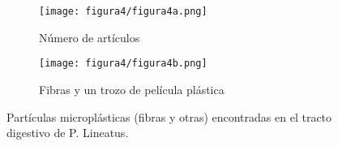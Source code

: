 \begin{figure}[h!t]
	\centering
	\begin{subfigure}[b]{0.6\linewidth}
		\texttt{[image: figura4/figura4a.png]}
		\caption{Número de artículos}
		\label{fig:numero_articulos}
	\end{subfigure}
	\begin{subfigure}[b]{0.2\linewidth}
		\texttt{[image: figura4/figura4b.png]}
		\caption{Fibras y un trozo de película plástica}
		\label{fig:fibra_pelicula}
	\end{subfigure}
	\caption{Partículas microplásticas (fibras y otras) encontradas en el tracto digestivo de P. Lineatus.}
	\label{fig:particulas_microplasticas}
\end{figure}

